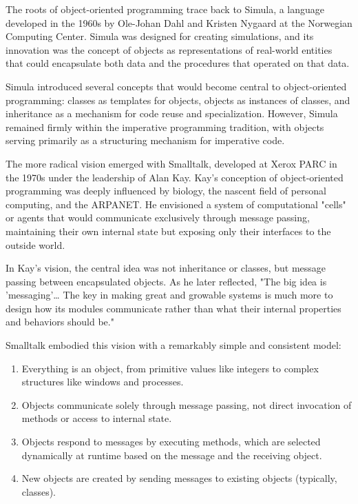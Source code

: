 \documentclass[11pt]{article}
\begin{document}
The roots of object-oriented programming trace back to Simula, a language developed in the 1960s by Ole-Johan Dahl and Kristen Nygaard at the Norwegian Computing Center. Simula was designed for creating simulations, and its innovation was the concept of objects as representations of real-world entities that could encapsulate both data and the procedures that operated on that data.

Simula introduced several concepts that would become central to object-oriented programming: classes as templates for objects, objects as instances of classes, and inheritance as a mechanism for code reuse and specialization. However, Simula remained firmly within the imperative programming tradition, with objects serving primarily as a structuring mechanism for imperative code.

The more radical vision emerged with Smalltalk, developed at Xerox PARC in the 1970s under the leadership of Alan Kay. Kay's conception of object-oriented programming was deeply influenced by biology, the nascent field of personal computing, and the ARPANET. He envisioned a system of computational "cells" or agents that would communicate exclusively through message passing, maintaining their own internal state but exposing only their interfaces to the outside world.

In Kay's vision, the central idea was not inheritance or classes, but message passing between encapsulated objects. As he later reflected, "The big idea is 'messaging'\ldots{} The key in making great and growable systems is much more to design how its modules communicate rather than what their internal properties and behaviors should be."

Smalltalk embodied this vision with a remarkably simple and consistent model:

\begin{enumerate}
\item Everything is an object, from primitive values like integers to complex structures like windows and processes.

\item Objects communicate solely through message passing, not direct invocation of methods or access to internal state.

\item Objects respond to messages by executing methods, which are selected dynamically at runtime based on the message and the receiving object.

\item New objects are created by sending messages to existing objects (typically, classes).
\end{enumerate}
\end{document}
